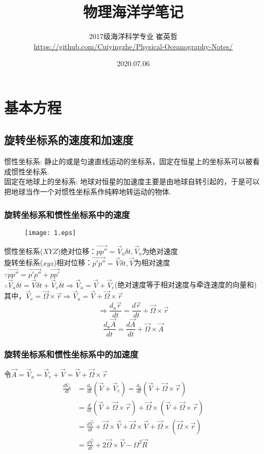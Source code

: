 \documentclass[a4paper,12pt]{article}
\title{\heiti 物理海洋学笔记}
\author{\small 2017级海洋科学专业 崔英哲 \\ \small \url{https://github.com/Cuiyingzhe/Physical-Oceanography-Notes/}}
\date{\small 2020.07.06}
\begin{document}
    \maketitle
    \renewcommand*\contentsname{}
	\tableofcontents
    \newpage
    \section{基本方程}
    \subsection{旋转坐标系的速度和加速度}
    \setlength{\parindent}{0pt}
    惯性坐标系:
    静止的或是匀速直线运动的坐标系，固定在恒星上的坐标系可以被看成惯性坐标系.\\
    固定在地球上的坐标系:
    地球对恒星的加速度主要是由地球自转引起的，于是可以把地球当作一个对惯性坐标系作纯粹地转运动的物体.
    \subsubsection{旋转坐标系和惯性坐标系中的速度}
    \begin{figure}[H]
		\centering\texttt{[image: 1.eps]}
		\caption*{}
    \end{figure}
    惯性坐标系($XYZ$)绝对位移：$\vec{pp''}=\vec{V}_a\delta t, \vec{V}_a$为绝对速度\\
    旋转坐标系($xyz$)相对位移：$\vec{p'p''}=\vec{V}\delta t, \vec{V}$为相对速度\\
    $\because \vec{pp''}=\vec{p'p''}+\vec{pp'}$ \\
    $\therefore\vec{V}_a\delta t=\vec{V}\delta t+\vec{V}_e\delta t\Rightarrow\vec{V}_a=\vec{V}+\vec{V}_e$(绝对速度等于相对速度与牵连速度的向量和)\\
    其中，$\vec{V}_e=\vec{\Omega}\times\vec{r}\Rightarrow\vec{V}_a=\vec{V}+\vec{\Omega}\times\vec{r}$
    \[
        \Rightarrow\frac{d_a\vec{r}}{dt}=\frac{d\vec{r}}{dt}+\vec{\Omega}\times\vec{r}
    \]
    \[
        \frac{d_a\vec{A}}{dt}=\frac{d\vec{A}}{dt}+\vec{\Omega}\times\vec{A}
    \]
    \subsubsection{旋转坐标系和惯性坐标系中的加速度}
    令$\vec{A}=\vec{V}_a=\vec{V}_e+\vec{V}=\vec{V}+\vec{\Omega}\times\vec{r}$
    \begin{equation*}
        \begin{aligned} \frac{d \bar{V}_{a}}{d t} &=\frac{d_{a}}{d t}\left(\vec{V}+\vec{V}_{e}\right)=\frac{d_{a}}{d t}(\vec{V}+\vec{\Omega} \times \vec{r}) \\ &=\frac{d}{d t}(\vec{V}+\vec{\Omega} \times \vec{r})+\vec{\Omega} \times(\vec{V}+\vec{\Omega} \times \vec{r}) \\ &=\frac{d \vec{V}}{d t}+\vec{\Omega} \times \vec{V}+\vec{\Omega} \times \vec{V}+\vec{\Omega} \times(\vec{\Omega} \times \vec{r}) \\ &=\frac{d \vec{V}}{d t}+2 \vec{\Omega} \times \vec{V}-\Omega^{2} \vec{R} \end{aligned}
    \end{equation*}
\end{document}
